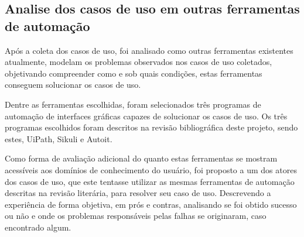\documentclass[tg]{mdtufsm}
\begin{document}
        	\subsection{Analise dos casos de uso em outras ferramentas de automação}

            	Após a coleta dos casos de uso, foi analisado como outras ferramentas existentes atualmente, modelam os problemas observados nos casos de uso coletados, objetivando compreender como e sob quais condições, estas ferramentas conseguem solucionar os casos de uso.

                Dentre as ferramentas escolhidas, foram selecionados três programas de automação de interfaces gráficas capazes de solucionar os casos de uso. Os três programas escolhidos foram descritos na revisão bibliográfica deste projeto, sendo estes, UiPath, Sikuli e Autoit.

            	Como forma de avaliação adicional do quanto estas ferramentas se mostram acessíveis aos domínios de conhecimento do usuário, foi proposto a um dos atores dos casos de uso, que este tentasse utilizar as mesmas ferramentas de automação descritas na revisão literária, para resolver seu caso de uso. Descrevendo a experiência de forma objetiva, em prós e contras, analisando se foi obtido sucesso ou não e onde os problemas responsáveis pelas falhas se originaram, caso encontrado algum.
            	\bigskip
\end{document}
